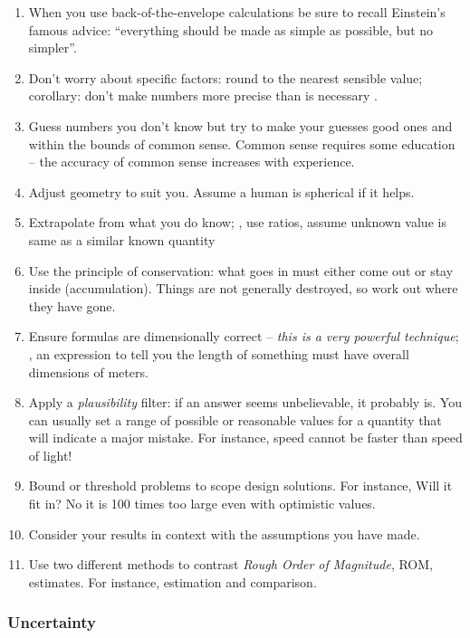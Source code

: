 \begin{enumerate}
\item When you use back-of-the-envelope calculations be sure to recall Einstein's famous advice: ``everything should be made as simple as possible, but no simpler''. 
%
\item Don't worry about specific factors: round to the nearest sensible value; corollary: don't make numbers more precise than is necessary .
%
\item Guess numbers you don't know but try to make your guesses good ones and within the bounds of common sense. Common sense requires some education -- the accuracy of common sense increases with experience.
%
\item Adjust geometry to suit you. Assume a human is spherical if it helps. 
%
\item Extrapolate from what you do know; \eg, use ratios, assume unknown value is same as a similar known quantity
%
\item Use the principle of conservation: what goes in must either come out or stay inside (accumulation). Things are not generally destroyed, so work out where they have gone.
%
\item Ensure formulas are dimensionally correct -- \emph{this is a very powerful technique}; \ie, an expression to tell you the length of something must have overall dimensions of meters.
%
\item Apply a \emph{plausibility} filter: if an answer seems unbelievable, it probably is. You can usually set a range of possible or reasonable values for a quantity that will indicate a major mistake. For instance, speed cannot be faster than speed of light!
%
\item Bound or threshold problems to scope design solutions. For instance, Will it fit in? No it is 100 times too large even with optimistic values.
%
\item Consider your results in context with the assumptions you have made.
%
\item Use two different methods to contrast \emph{Rough Order of Magnitude}, ROM, estimates. For instance, estimation and comparison.
\end{enumerate}


\subsubsection{Uncertainty}

